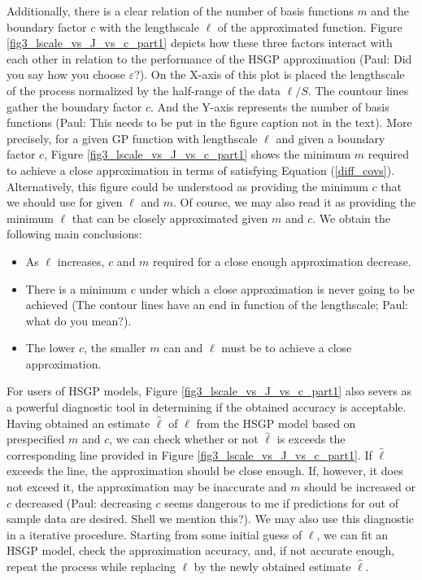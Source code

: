 \documentclass[]{interact}
\theoremstyle{plain}%
\theoremstyle{definition}
\theoremstyle{remark}
\begin{document}
Additionally, there is a clear relation of the number of basis functions $m$ and the boundary factor $c$ with the lengthscale $\ell$ of the approximated function. Figure \ref{fig3_lscale_vs_J_vs_c_part1} depicts how these three factors interact with each other in relation to the performance of the HSGP approximation (Paul: Did you say how you choose $\varepsilon$?). On the X-axis of this plot is placed the lengthscale of the process normalized by the half-range of the data $\ell/S$. The countour lines gather the boundary factor $c$. And the Y-axis represents the number of basis functions (Paul: This needs to be put in the figure caption not in the text). More precisely, for a given GP function with lengthscale $\ell$ and given a boundary factor $c$, Figure \ref{fig3_lscale_vs_J_vs_c_part1} shows the minimum $m$ required to achieve a close approximation in terms of satisfying Equation (\ref{diff_covs}). Alternatively, this figure could be understood as providing the minimum $c$ that we should use for given $\ell$ and $m$. Of course, we may also read it as providing the minimum $\ell$ that can be closely approximated given $m$ and $c$. We obtain the following main conclusions:

\begin{itemize}
\item As $\ell$ increases, $c$ and $m$ required for a close enough approximation decrease.
\item There is a minimum $c$ under which a close approximation is never going to be achieved (The contour lines have an end in function of the lengthscale; Paul: what do you mean?).
\item The lower $c$, the smaller $m$ can and $\ell$ must be to achieve a close approximation.
\end{itemize}

For users of HSGP models, Figure \ref{fig3_lscale_vs_J_vs_c_part1} also severs as a powerful diagnostic tool in determining if the obtained accuracy is acceptable.  Having obtained an estimate $\hat{\ell}$ of $\ell$ from the HSGP model based on prespecified $m$ and $c$, we can check whether or not $\hat{\ell}$ is exceeds the corresponding line provided in Figure \ref{fig3_lscale_vs_J_vs_c_part1}. If $\hat{\ell}$ exceeds the line, the approximation should be close enough. If, however, it does not exceed it, the approximation may be inaccurate and $m$ should be increased or $c$ decreased (Paul: decreasing $c$ seems dangerous to me if predictions for out of sample data are desired. Shell we mention this?). We may also use this diagnostic in a iterative procedure.
Starting from some initial guess of $\ell$, we can fit an HSGP model, check the approximation accuracy, and, if not accurate enough, repeat the process while replacing $\ell$ by the newly obtained estimate $\hat{\ell}$.
\end{document}
